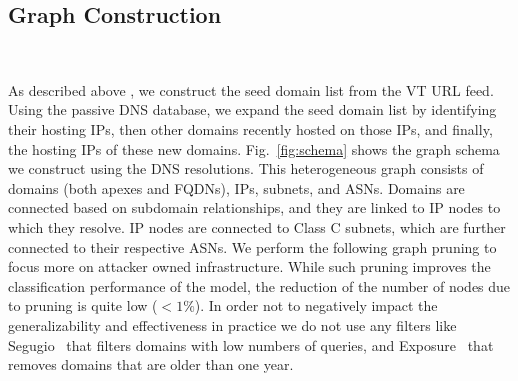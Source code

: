 




\subsection{Graph Construction}
~\label{subsec:graphconstruction}

As described above , we construct the seed domain list from the VT URL feed. Using the passive DNS database, we expand the seed domain list by identifying their hosting IPs, then other domains recently hosted on those IPs, and finally, the hosting IPs of these new domains. Fig.~\ref{fig:schema} shows the graph schema we construct using the DNS resolutions. This heterogeneous graph consists of domains (both apexes and FQDNs), IPs, subnets, and ASNs. Domains are connected based on subdomain relationships, and they are linked to IP nodes to which they resolve.
IP nodes are connected to Class C subnets, which are further connected to their respective ASNs. We perform the following graph pruning to 
focus more on attacker owned infrastructure. While such pruning improves the classification performance of the model, the reduction of the number of nodes due to pruning is quite low ($<1\%$).
In order not to negatively impact the generalizability and effectiveness in practice we do not use any filters like Segugio~\cite{Segugio_Rahbarinia2015} that filters domains with low numbers of queries, and Exposure~\cite{Exposure_Bilge2011} that removes domains that are older than one year.

